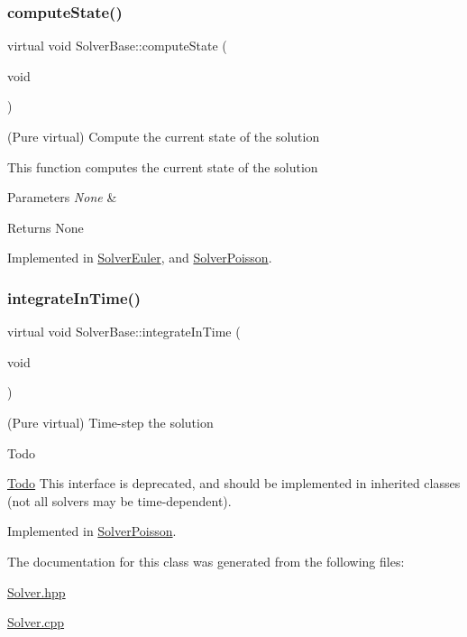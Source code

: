 \subsubsection{\texorpdfstring{compute\+State()}{computeState()}}
{\footnotesize\ttfamily virtual void Solver\+Base\+::compute\+State (\begin{DoxyParamCaption}\item[{void}]{ }\end{DoxyParamCaption})\hspace{0.3cm}{\ttfamily [pure virtual]}}



(Pure virtual) Compute the current state of the solution 

This function computes the current state of the solution 
\begin{DoxyParams}{Parameters}
{\em None} & \\
\hline
\end{DoxyParams}
\begin{DoxyReturn}{Returns}
None 
\end{DoxyReturn}


Implemented in \mbox{\hyperlink{class_solver_euler_a5aa41447d61bd488d39ad12f97022473}{Solver\+Euler}}, and \mbox{\hyperlink{class_solver_poisson_a1955e79999fcf055aebad5b15fda1563}{Solver\+Poisson}}.

\mbox{\label{class_solver_base_af2c51a926b461351926101b11cc6b60a}} 
\subsubsection{\texorpdfstring{integrate\+In\+Time()}{integrateInTime()}}
{\footnotesize\ttfamily virtual void Solver\+Base\+::integrate\+In\+Time (\begin{DoxyParamCaption}\item[{void}]{ }\end{DoxyParamCaption})\hspace{0.3cm}{\ttfamily [pure virtual]}}



(Pure virtual) Time-\/step the solution 

\begin{DoxyRefDesc}{Todo}
\item[\mbox{\hyperlink{todo__todo000011}{Todo}}]This interface is deprecated, and should be implemented in inherited classes (not all solvers may be time-\/dependent). \end{DoxyRefDesc}


Implemented in \mbox{\hyperlink{class_solver_poisson_a4ff8a1c96b933bc01fdd411d3ae45f20}{Solver\+Poisson}}.



The documentation for this class was generated from the following files\+:\begin{DoxyCompactItemize}
\item 
\mbox{\hyperlink{_solver_8hpp}{Solver.\+hpp}}\item 
\mbox{\hyperlink{_solver_8cpp}{Solver.\+cpp}}\end{DoxyCompactItemize}
